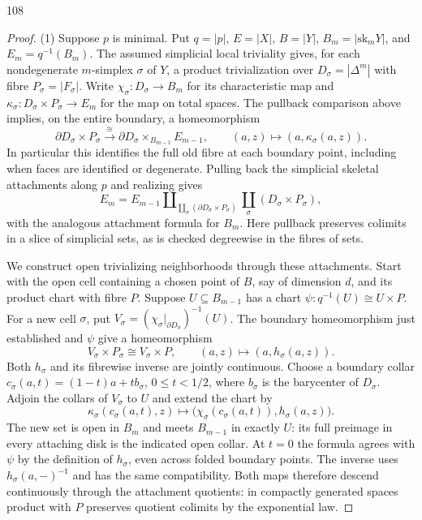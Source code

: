 \begin{exercise}{108}
\begin{proof}
(1) Suppose $p$ is minimal. Put $q=|p|$, $E=|X|$, $B=|Y|$,
$B_m=|\mathrm{sk}_mY|$, and $E_m=q^{-1}(B_m)$.
The assumed simplicial local triviality gives, for each nondegenerate
$m$-simplex $\sigma$ of $Y$, a product trivialization over
$D_\sigma=|\Delta^m|$ with fibre $P_\sigma=|F_\sigma|$.
Write $\chi_\sigma\colon D_\sigma\to B_m$ for its characteristic map and
$\kappa_\sigma\colon D_\sigma\times P_\sigma\to E_m$ for the map on total spaces.
The pullback comparison above implies, on the entire boundary, a homeomorphism
\[
 \partial D_\sigma\times P_\sigma
 \xrightarrow{\cong}
 \partial D_\sigma\times_{B_{m-1}}E_{m-1},
 \qquad (a,z)\longmapsto(a,\kappa_\sigma(a,z)).
\]
In particular this identifies the full old fibre at each boundary point,
including when faces are identified or degenerate.
Pulling back the simplicial skeletal attachments along $p$ and realizing gives
\[
 E_m=E_{m-1}\amalg_{\coprod_\sigma(\partial D_\sigma\times P_\sigma)}
                  \coprod_\sigma(D_\sigma\times P_\sigma),
\]
with the analogous attachment formula for $B_m$.
Here pullback preserves colimits in a slice of simplicial sets, as is
checked degreewise in the fibres of sets.

We construct open trivializing neighborhoods through these attachments.
Start with the open cell containing a chosen point of $B$, say of
dimension $d$, and its product chart with fibre $P$.
Suppose $U\subseteq B_{m-1}$ has a chart
$\psi\colon q^{-1}(U)\cong U\times P$.
For a new cell $\sigma$, put
$V_\sigma=(\chi_\sigma|_{\partial D_\sigma})^{-1}(U)$.
The boundary homeomorphism just established and $\psi$ give a homeomorphism
\[
 V_\sigma\times P_\sigma\cong V_\sigma\times P,
 \qquad (a,z)\longmapsto(a,h_\sigma(a,z)).
\]
Both $h_\sigma$ and its fibrewise inverse are jointly continuous.
Choose a boundary collar $c_\sigma(a,t)=(1-t)a+t b_\sigma$,
$0\le t<1/2$, where $b_\sigma$ is the barycenter of $D_\sigma$.
Adjoin the collars of $V_\sigma$ to $U$ and extend the chart by
\[
 \kappa_\sigma(c_\sigma(a,t),z)
 \longmapsto
 \bigl(\chi_\sigma(c_\sigma(a,t)),h_\sigma(a,z)\bigr).
\]
The new set is open in $B_m$ and meets $B_{m-1}$ in exactly $U$:
its full preimage in every attaching disk is the indicated open collar.
At $t=0$ the formula agrees with $\psi$ by the definition of
$h_\sigma$, even across folded boundary points.
The inverse uses $h_\sigma(a,-)^{-1}$ and has the same compatibility.
Both maps therefore descend continuously through the attachment quotients:
in compactly generated spaces product with $P$ preserves quotient
colimits by the exponential law.


\end{proof}
\end{exercise}
